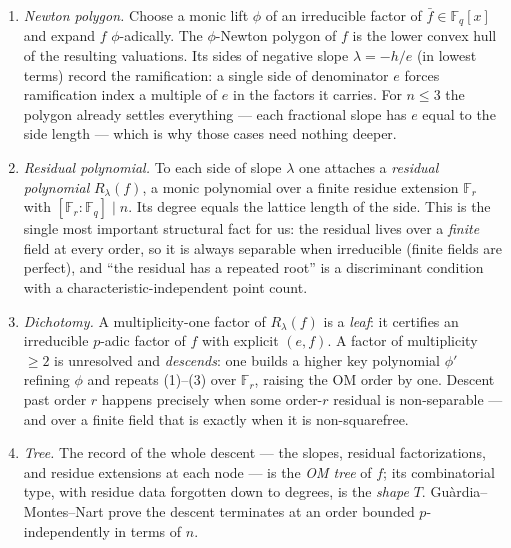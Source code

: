 \documentclass[pdflatex,sn-mathphys-num]{sn-jnl}%
\newcommand{\bbF}{\mathbb{F}}
\theoremstyle{plain}
\theoremstyle{definition}
\theoremstyle{remark}
\numberwithin{equation}{section}
\begin{document}
\begin{enumerate}[label=\textup{(\arabic*)},leftmargin=2.4em]
\item \emph{Newton polygon.} Choose a monic lift $\phi$ of an irreducible factor of
$\bar f\in\bbF_{q}[x]$ and expand $f$ $\phi$-adically. The $\phi$-Newton polygon of
$f$ is the lower convex hull of the resulting valuations. Its sides of negative
slope $\lambda=-h/e$ (in lowest terms) record the ramification: a single side of
denominator $e$ forces ramification index a multiple of $e$ in the factors it
carries. For $n\le3$ the polygon already settles everything --- each fractional
slope has $e$ equal to the side length --- which is why those cases need nothing
deeper.
\item \emph{Residual polynomial.} To each side of slope $\lambda$ one attaches a
\emph{residual polynomial} $R_{\lambda}(f)$, a monic polynomial over a finite
residue extension $\bbF_{r}$ with $[\bbF_{r}:\bbF_{q}]\mid n$. Its degree equals the
lattice length of the side. This is the single most important structural fact for
us: the residual lives over a \emph{finite} field at every order, so it is always
separable when irreducible (finite fields are perfect), and ``the residual has a
repeated root'' is a discriminant condition with a characteristic-independent point
count.
\item \emph{Dichotomy.} A multiplicity-one factor of $R_{\lambda}(f)$ is a
\emph{leaf}: it certifies an irreducible $p$-adic factor of $f$ with explicit
$(e,f)$. A factor of multiplicity $\ge2$ is unresolved and \emph{descends}: one
builds a higher key polynomial $\phi'$ refining $\phi$ and repeats (1)--(3) over
$\bbF_{r}$, raising the OM order by one. Descent past order $r$ happens precisely
when some order-$r$ residual is non-separable --- and over a finite field that is
exactly when it is non-squarefree.
\item \emph{Tree.} The record of the whole descent --- the slopes, residual
factorizations, and residue extensions at each node --- is the \emph{OM tree} of
$f$; its combinatorial type, with residue data forgotten down to degrees, is the
\emph{shape} $T$. Gu\`ardia--Montes--Nart prove the descent terminates at an order
bounded $p$-independently in terms of $n$.
\end{enumerate}
\end{document}
